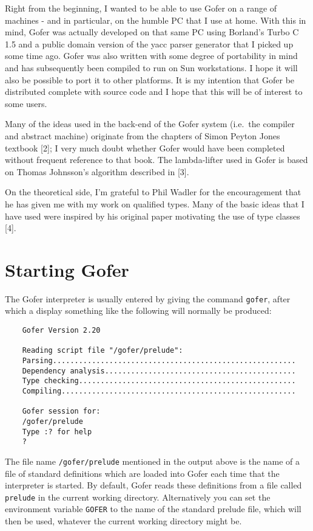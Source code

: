 Right from the beginning, I wanted to be able to use Gofer on  a  range
of machines - and in particular, on the humble PC that I use  at  home.
With this in mind, Gofer was actually developed on that same  PC  using
Borland's Turbo C 1.5 and a public domain version of  the  yacc  parser
generator that I picked up some time ago.  Gofer was also written  with
some degree of portability in mind and has subsequently  been  compiled
to run on Sun workstations.  I hope it will also be possible to port it
to other platforms.  It is  my  intention  that  Gofer  be  distributed
complete with source code and I hope that this will be of  interest  to
some users.

Many of the ideas used in the back-end of the Gofer  system  (i.e.\  the
compiler and abstract machine) originate from  the  chapters  of  Simon
Peyton Jones textbook [2]; I very much doubt whether Gofer  would  have
been  completed  without  frequent  reference  to   that   book.    The
lambda-lifter used in Gofer is based  on  Thomas  Johnsson's  algorithm
described in [3].

On  the  theoretical  side,  I'm  grateful  to  Phil  Wadler  for   the
encouragement that he has given me with my  work  on  qualified  types.
Many of the basic ideas that I have used were inspired by his  original
paper motivating the use of type classes [4].

\chapter{Starting Gofer}

The Gofer interpreter is usually entered by giving the command {\tt gofer},
after which a display something like the  following  will  normally  be
produced:
\begin{verbatim}
    Gofer Version 2.20
 
    Reading script file "/gofer/prelude":
    Parsing........................................................
    Dependency analysis............................................
    Type checking..................................................
    Compiling......................................................

    Gofer session for:
    /gofer/prelude
    Type :? for help
    ?
\end{verbatim}
The file name \verb"/gofer/prelude" mentioned in the  output  above  is  the
name of a file of standard definitions which are loaded into Gofer each
time that the interpreter is started.  By default,  Gofer  reads  these
definitions from  a  file  called  \verb"prelude"  in  the  current  working
directory.  Alternatively you can set the environment variable \verb"GOFER" to
the name of the  standard  prelude  file,  which  will  then  be  used,
whatever the current working directory might be.

